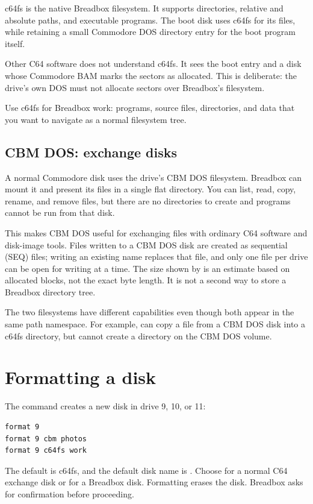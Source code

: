 c64fs is the native Breadbox filesystem. It supports directories, relative and absolute paths, and executable programs. The boot disk uses c64fs for its files, while retaining a small Commodore DOS directory entry for the boot program itself.

Other C64 software does not understand c64fs. It sees the boot entry and a disk whose Commodore BAM marks the sectors as allocated. This is deliberate: the drive's own DOS must not allocate sectors over Breadbox's filesystem.

Use c64fs for Breadbox work: programs, source files, directories, and data that you want to navigate as a normal filesystem tree.

\subsection{CBM DOS: exchange disks}

A normal Commodore disk uses the drive's CBM DOS filesystem. Breadbox can mount it and present its files in a single flat directory. You can list, read, copy, rename, and remove files, but there are no directories to create and programs cannot be run from that disk.

This makes CBM DOS useful for exchanging files with ordinary C64 software and disk-image tools. Files written to a CBM DOS disk are created as sequential (SEQ) files; writing an existing name replaces that file, and only one file per drive can be open for writing at a time. The size shown by  is an estimate based on allocated blocks, not the exact byte length. It is not a second way to store a Breadbox directory tree.

The two filesystems have different capabilities even though both appear in the same path namespace. For example,  can copy a file from a CBM DOS disk into a c64fs directory, but  cannot create a directory on the CBM DOS volume.

\section{Formatting a disk}

The  command creates a new disk in drive 9, 10, or 11:

\begin{lstlisting}
format 9
format 9 cbm photos
format 9 c64fs work
\end{lstlisting}

The default is c64fs, and the default disk name is . Choose  for a normal C64 exchange disk or  for a Breadbox disk. Formatting erases the disk. Breadbox asks for confirmation before proceeding.

